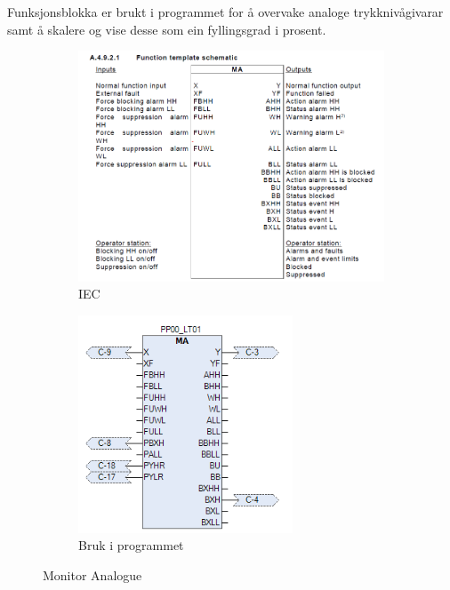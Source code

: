 Funksjonsblokka er brukt i programmet for å overvake analoge trykknivågivarar samt å skalere og vise desse som ein fyllingsgrad i prosent.

\begin{figure}[htbp]
    \centering
    \begin{subfigure}[b]{0.45\textwidth}
        \centering
        \includegraphics[width=1\textwidth]{Bilder/MABlokkIEC.png}
        \caption{IEC}\label{fig:Monitor Analogue blokk IEC}
    \end{subfigure}
    \hfill
    \begin{subfigure}[b]{0.45\textwidth}
        \centering
        \includegraphics[width=0.7\textwidth]{Bilder/MABlokkIProgrammet.png}
        \caption{Bruk i programmet}\label{fig:Monitor Analogue blokk i programmet}
    \end{subfigure}
    \caption{Monitor Analogue}\label{fig:Monitor Analogue}
\end{figure}

